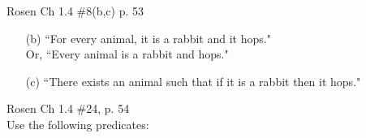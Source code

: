 \begin{questions}
\begin{enumerate}[label=(\alph*)]
\end{enumerate}



 Rosen Ch 1.4 \#8(b,c)  p. 53 
    \ifprintanswers
        \vspace{-12pt}
    \fi
  \begin{solution}
      \begin{itemize}[itemsep=0pt,parsep=0pt,topsep=0pt,partopsep=0pt]
          \item[(b)] ``For every animal, it is a rabbit and it hops." \\Or, ``Every animal is a rabbit and hops."
          \item[(c)] ``There exists an animal such that if it is a rabbit then it hops."
      \end{itemize}
  \end{solution}



 Rosen Ch 1.4 \#24, p. 54 \\
Use the following predicates:


\end{questions}
